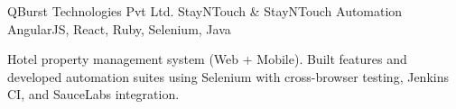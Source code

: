 \begin{cventries}




	\cventry
	{QBurst Technologies Pvt Ltd.} %
	{StayNTouch \& StayNTouch Automation} %
	{} %
	{AngularJS, React, Ruby, Selenium, Java} %
	{
		\begin{cvitems}
			\item[] Hotel property management system (Web + Mobile). Built features and developed automation suites using Selenium with cross-browser testing, Jenkins CI, and SauceLabs integration.
		\end{cvitems}
	}


\end{cventries}
